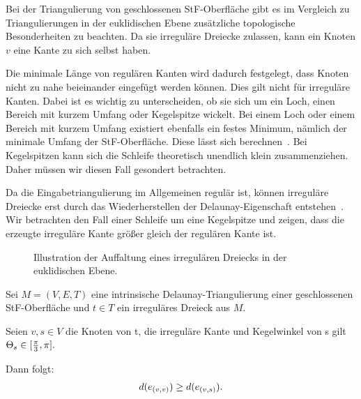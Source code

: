 Bei der Triangulierung von geschlossenen StF-Oberfläche gibt es im Vergleich zu Triangulierungen in der euklidischen Ebene zusätzliche topologische Besonderheiten zu beachten. Da sie irreguläre Dreiecke zulassen, kann ein Knoten $v$ eine Kante \irregulaereKante zu sich selbst haben.    



Die minimale Länge von regulären Kanten wird dadurch festgelegt, dass Knoten nicht zu nahe beieinander eingefügt werden können. Dies gilt nicht für irreguläre Kanten.
Dabei ist es wichtig zu unterscheiden, ob sie sich um ein Loch, einen Bereich mit kurzem Umfang oder Kegelspitze wickelt. Bei einem Loch oder einem Bereich mit kurzem Umfang existiert ebenfalls ein festes Minimum, nämlich der minimale Umfang der StF-Oberfläche. Diese lässt sich berechnen~\cite{erickson:2005:generator}. Bei Kegelspitzen kann sich die Schleife  theoretisch unendlich klein zusammenziehen. Daher müssen wir diesen Fall gesondert betrachten.   




Da die Eingabetriangulierung im Allgemeinen regulär ist, können irreguläre Dreiecke erst durch das Wiederherstellen der Delaunay-Eigenschaft entstehen~\cite{Bobenko:2006:SIGGRAPH,Bobenko:2007:LaplaceBeltrami}. Wir betrachten den Fall einer Schleife um eine Kegelspitze und zeigen, dass die erzeugte irreguläre Kante größer gleich der regulären Kante ist.




 \begin{figure}[h]
    \centering
    
    \caption{Illustration der Auffaltung eines irregulären Dreiecks in der euklidischen Ebene.}%
    \label{fig.irreglaere}
\end{figure}

\begin{lemma}
\label{le:irregulär_entfernung}
Sei $M = (V,E,T)$ eine intrinsische Delaunay-Triangulierung  einer geschlossenen  StF-Oberfläche und  $t \in T$ ein irreguläres Dreieck aus $M$. 


Seien $v,s \in V$ die Knoten von t, \irregulaereKante die irreguläre Kante und Kegelwinkel \gesamtwinkel[s] von s gilt $\gesamtwinkel*[s] \in [\frac{\pi}{3}, \pi].$


Dann folgt:
\begin{align*}
    d(\irregulaereKante*) \geq d(\regulaereKante*).\\
\end{align*}  
\end{lemma}

